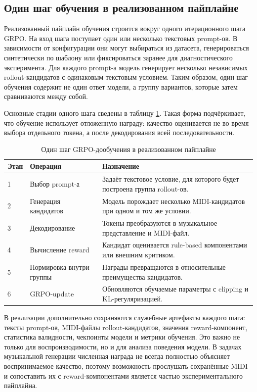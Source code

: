 \documentclass[a4paper,12pt]{extarticle}
\begin{document}
\subsection{Один шаг обучения в реализованном пайплайне}

Реализованный пайплайн обучения строится вокруг одного итерационного
шага GRPO. На вход шага поступает один или несколько текстовых prompt-ов.
В зависимости от конфигурации они могут выбираться из датасета,
генерироваться синтетически по шаблону или фиксироваться заранее для
диагностического эксперимента. Для каждого prompt-а модель генерирует
несколько независимых rollout-кандидатов с одинаковым текстовым
условием. Таким образом, один шаг обучения содержит не один ответ модели,
а группу вариантов, которые затем сравниваются между собой.

Основные стадии одного шага сведены в таблицу
\ref{tab:grpo_training_step}. Такая форма подчёркивает, что обучение
использует отложенную награду: качество оценивается не во время выбора
отдельного токена, а после декодирования всей последовательности.

\begin{table}[ht]
\centering
\caption{Один шаг GRPO-дообучения в реализованном пайплайне}
\label{tab:grpo_training_step}
\begin{tabular}{p{}p{}p{}}
\toprule
Этап & Операция & Назначение \\
\midrule
1 & Выбор prompt-а & Задаёт текстовое условие, для которого будет построена группа rollout-ов. \\
2 & Генерация кандидатов & Модель порождает несколько MIDI-кандидатов при одном и том же условии. \\
3 & Декодирование & Токены преобразуются в музыкальное представление и MIDI-файл. \\
4 & Вычисление reward & Кандидат оценивается rule-based компонентами или внешним критиком. \\
5 & Нормировка внутри группы & Награды превращаются в относительные преимущества кандидатов. \\
6 & GRPO-update & Обновляются обучаемые параметры с clipping и KL-регуляризацией. \\
\bottomrule
\end{tabular}
\end{table}

В реализации дополнительно сохраняются служебные артефакты каждого шага:
тексты prompt-ов, MIDI-файлы rollout-кандидатов, значения
reward-компонент, статистика валидности, чекпоинты модели и метрики обучения.
Это важно не только для воспроизводимости, но и для анализа поведения
модели. В задачах музыкальной генерации численная награда не всегда
полностью объясняет воспринимаемое качество, поэтому возможность
прослушать сохранённые MIDI и сопоставить их с reward-компонентами
является частью экспериментального пайплайна.
\end{document}
